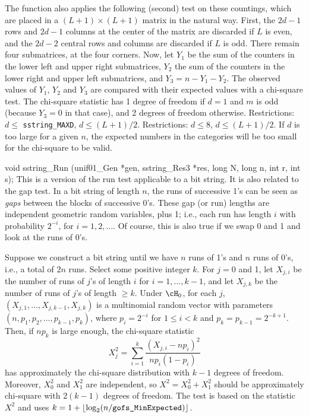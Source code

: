   The function also applies the following (second) test on these countings,
  which are placed in a $(L+1)\times(L+1)$ matrix in the natural way.
  First, the  $2d-1$ rows and $2d-1$  columns at the center of the matrix
  are discarded if $L$ is even, and the $2d-2$ central rows and columns
  are discarded if $L$ is odd.
  There remain four submatrices, at the four corners.
  Now, let $Y_1$ be the sum of the counters in the lower left and
  upper right submatrices, $Y_2$ the sum of the counters in the
  lower right and upper left submatrices, and $Y_3 = n - Y_1 - Y_2$.
  The observed values of $Y_1$, $Y_2$  and $Y_3$ are compared with their
  expected values with a chi-square test. 
  The chi-square statistic has 1 degree of freedom if $d=1$ and $m$ is odd
   (because $Y_3=0$ in that case),  and 2 degrees of freedom otherwise.
\ifdetailed
  Restrictions:   $d \le $ {\tt sstring\_MAXD}, $d \le (L + 1)/2$.
\else
  Restrictions:   $d \le 8$, $d \le (L + 1)/2$.
\fi
  If $d$ is too large for a given $n$, the expected numbers in the 
   categories will be too small for the chi-square to be valid.
  \endtab
\code


void sstring_Run (unif01_Gen *gen, sstring_Res3 *res,
                  long N, long n, int r, int s);
\endcode
 \tab  This is a version of the run test applicable to a bit string.
  It is also related to the gap test.
  In a bit string of length $n$, the runs of successive 1's can be seen
  as {\em gaps\/} between the blocks of successive 0's.
  These gap (or run) lengths are independent geometric random variables, 
  plus 1; i.e., each run has length $i$ with probability $2^{-i}$,
  for $i=1,2,\dots$.  Of course, this is also true if we swap 0 and 1
  and look at the runs of 0's.

  Suppose we construct a bit string until we have $n$ runs of 1's and
  $n$ runs of 0's, i.e., a total of $2n$ runs.
  Select some positive integer $k$.
  For $j=0$ and 1, let $X_{j,i}$ be the number of runs of $j$'s of 
  length $i$ for $i = 1,\dots,k-1$, and let $X_{j,k}$ 
  be the number of runs of $j$'s of length $\ge k$. 
  Under $\cH_0$, for each $j$, $(X_{j,1},\dots,X_{j,k-1},X_{j,k})$ 
  is a multinomial random vector with parameters 
  $(n, p_1, p_2, \dots, p_{k-1}, p_k)$, where
  $p_i = 2^{-i}$ for $1\le i < k$ and $p_k = p_{k-1} = 2^{-k+1}$.
  Then, if $n p_k$ is large enough, the chi-square statistic 
$$
  X_j^2 = \sum_{i=1}^k \frac{(X_{j,i} - n p_i)^2}{n p_i(1-p_i)}
$$
  has approximately the chi-square distribution with $k-1$ degrees
  of freedom.
  Moreover, $X_0^2$ and $X_1^2$ are independent,
  so $X^2 = X_0^2 + X_1^2$ should be approximately chi-square with
  $2(k-1)$ degrees of freedom.
  The test is based on the statistic $X^2$ and uses 
  $k = 1 + \lfloor \log_2 (n / \mbox{\tt gofs\_MinExpected}) \rfloor$.

